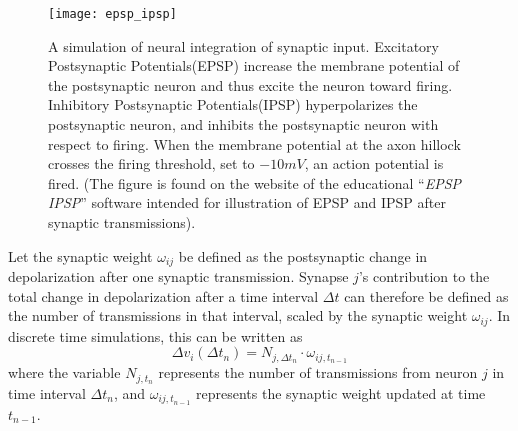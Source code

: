 \begin{figure}[hbt!p]
	\centering
	\texttt{[image: epsp\_ipsp]}
	\caption[Illustration of neural integration of synaptic input]{
			A simulation of neural integration of synaptic input. 
			Excitatory Postsynaptic Potentials(EPSP) increase the membrane potential of the postsynaptic neuron and thus excite the neuron toward firing.
			Inhibitory Postsynaptic Potentials(IPSP) hyperpolarizes the postsynaptic neuron, and inhibits the postsynaptic neuron with respect to firing.
			When the membrane potential at the axon hillock crosses the firing threshold, set to $-10mV$, an action potential is fired.
			(The figure is found on the website of the educational ``\emph{EPSP IPSP}'' software intended for illustration of EPSP and IPSP after synaptic transmissions).
				}
	\label{figIllustrationOfEPSPandIPSP}
\end{figure}


	Let the synaptic weight $\omega_{ij}$ be defined as the postsynaptic change in depolarization after one synaptic transmission. 	
	Synapse $j$'s contribution to the total change in depolarization after a time interval $\Delta t$ can therefore be defined as the number of transmissions in that interval, scaled by the synaptic weight $\omega_{ij}$.
	In discrete time simulations, this can be written as
	\begin{equation}
		\Delta v_{i}(\Delta t_n) = N_{j,\Delta t_n}\cdot\omega_{ij, t_{n-1}} %
	\end{equation}
	where the variable $N_{j,t_n}$ represents the number of transmissions from neuron $j$ in time interval $\Delta t_n$, and $\omega_{ij, t_{n-1}}$ represents the synaptic weight updated at time $t_{n-1}$.

